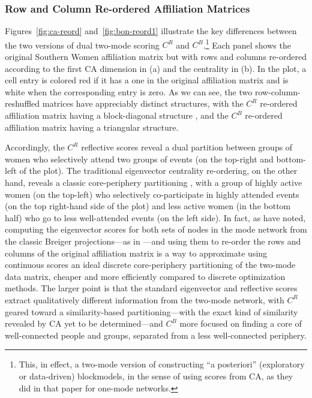 \documentclass[a4paper,fleqn]{cas-sc}
\begin{document}
\subsubsection{Row and Column Re-ordered Affiliation Matrices} \label{sec:affmats}
Figures~\ref{fig:ca-reord} and~\ref{fig:bon-reord1} illustrate the key differences between the two versions of dual two-mode scoring $C^R$ and $C^B$.\footnote{This, in effect, a two-mode version of constructing ``a posteriori'' (exploratory or data-driven) blockmodels, in the sense of \citet{wasserman1987stochastic} using scores from CA, as they did in that paper for one-mode networks.} Each panel shows the original Southern Women affiliation matrix but with rows and columns re-ordered according to the first CA dimension in (a) and the \citet{bonacich1991simultaneous} centrality in (b). In the plot, a cell entry is colored red if it has a one in the original affiliation matrix and is white when the corresponding entry is zero. As we can see, the two row-column-reshuffled matrices have appreciably distinct structures, with the $C^R$ re-ordered affiliation matrix having a block-diagonal structure \citep[34]{wasserman1990correspondence}, and the $C^B$ re-ordered affiliation matrix having a triangular structure. 

Accordingly, the $C^R$ reflective scores reveal a dual partition between groups of women who selectively attend two groups of events (on the top-right and bottom-left of the plot). The traditional eigenvector centrality re-ordering, on the other hand, reveals a classic core-periphery partitioning \citep{borgatti2000models}, with a group of highly active women (on the top-left) who selectively co-participate in highly attended events (on the top right-hand side of the plot) and less active women (in the bottom half) who go to less well-attended events (on the left side). In fact, as \citet[p. 206-207]{everett2013dual} have noted, computing the eigenvector scores for both sets of nodes in the mode network from the classic Breiger projections---as in \citet{bonacich1991simultaneous}---and using them to re-order the rows and columns of the original affiliation matrix is a way to approximate using continuous scores an ideal discrete core-periphery partitioning of the two-mode data matrix, cheaper and more efficiently compared to discrete optimization methods. The larger point is that the standard eigenvector and reflective scores extract qualitatively different information from the two-mode network, with $C^R$ geared toward a similarity-based partitioning---with the exact kind of similarity revealed by CA yet to be determined---and $C^B$ more focused on finding a core of well-connected people and groups, separated from a less well-connected periphery. 
\end{document}
